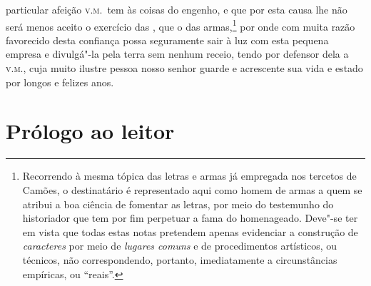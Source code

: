 particular afeição \textsc{v.m.}~tem às coisas do engenho, e que por esta causa		%
lhe não será menos aceito o exercício das , que o das
armas,\footnote{ Recorrendo à mesma tópica das letras e armas já
empregada nos tercetos de Camões, o destinatário  é representado aqui
como homem de armas a quem se atribui a boa ciência de fomentar as
letras, por meio do testemunho do historiador que tem por fim perpetuar
a fama do homenageado. Deve"-se ter em vista que todas estas notas
pretendem apenas evidenciar a construção de \textit{caracteres} por
meio de \textit{lugares comuns} e de procedimentos artísticos, ou
técnicos, não correspondendo, portanto, imediatamente a circunstâncias
empíricas, ou ``reais''.} por onde com muita
razão favorecido desta confiança possa seguramente sair à luz com esta
pequena empresa e divulgá"-la pela terra sem nenhum receio, tendo por
defensor dela a \textsc{v.m.}, cuja muito ilustre pessoa nosso senhor guarde e
acrescente sua vida e estado por longos e felizes anos. 

\chapter[Prólogo ao leitor]{Prólogo ao leitor}


